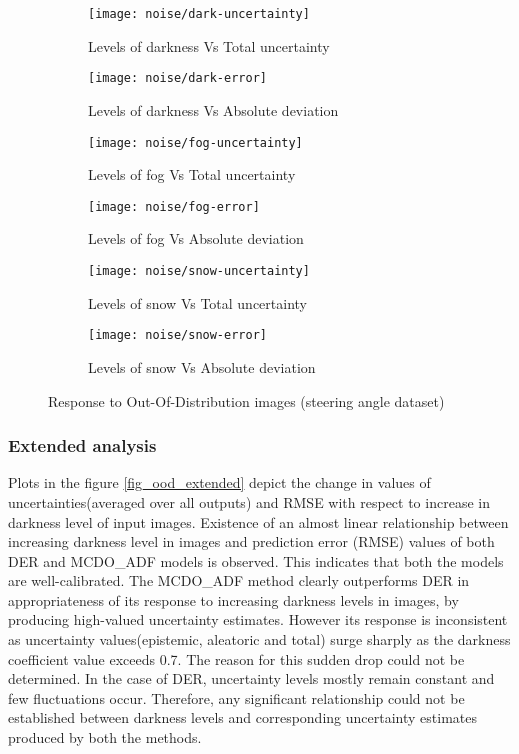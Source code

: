 \begin{figure}[H]
	\centering
	\begin{subfigure}[b]{0.45\textwidth}
		\centering
		\texttt{[image: noise/dark-uncertainty]}
		\caption{Levels of darkness Vs Total uncertainty}
		\label{mcdo_fn2}
	\end{subfigure}
	\hfill
	\begin{subfigure}[b]{0.45\textwidth}
		\centering
		\texttt{[image: noise/dark-error]}
		\caption{Levels of darkness Vs Absolute deviation}
		\label{der_fn2}
	\end{subfigure}
	\hfill
	\begin{subfigure}[b]{0.45\textwidth}
		\centering
		\texttt{[image: noise/fog-uncertainty]}
		\caption{Levels of fog Vs Total uncertainty}
		\label{homo_fn3}
	\end{subfigure}
	\hfill
	\begin{subfigure}[b]{0.45\textwidth}
		\centering
		\texttt{[image: noise/fog-error]}
		\caption{Levels of fog Vs Absolute deviation}
		\label{hetero_fn3}
	\end{subfigure}
	\hfill
	\begin{subfigure}[b]{0.45\textwidth}
		\centering
		\texttt{[image: noise/snow-uncertainty]}
		\caption{Levels of snow Vs Total uncertainty}
		\label{mcdo_fn3}
	\end{subfigure}
	\hfill
	\begin{subfigure}[b]{0.45\textwidth}
	\centering
	\texttt{[image: noise/snow-error]}
	\caption{Levels of snow Vs Absolute deviation}
	\label{mcdo_fn3}
	\end{subfigure}
	\hfill
	\caption{Response to Out-Of-Distribution images (steering angle dataset)}
	\label{fig_noise_fog}
\end{figure}
\subsubsection{Extended analysis}
Plots in the figure \ref{fig_ood_extended} depict the change in values of uncertainties(averaged over all outputs) and RMSE with respect to increase in darkness level of input images. Existence of an almost linear relationship between increasing darkness level in images and prediction error (RMSE) values of both DER and MCDO\_ADF models is observed. This indicates that both the models are well-calibrated. The MCDO\_ADF method clearly outperforms DER in appropriateness of its response to increasing darkness levels in images, by producing high-valued uncertainty estimates. However its response is inconsistent as uncertainty values(epistemic, aleatoric and total) surge sharply as the darkness coefficient value exceeds 0.7. The reason for this sudden drop could not be determined. In the case of DER, uncertainty levels mostly remain constant and few fluctuations occur. Therefore, any significant relationship could not be established between darkness levels and corresponding uncertainty estimates produced by both the methods. 

